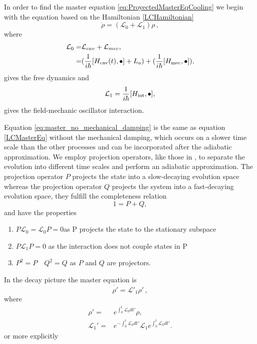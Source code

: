 \documentclass[reprint, amsmath,amssymb, aps,pra]{revtex4-1}
\begin{document}
In order to find the master equation
\eqref{eq:ProyectedMasterEqCooling} we begin with the equation based on the Hamiltonian \eqref{LCHamiltonian}
\begin{equation}\label{eq:master_no_mechanical_damping}
\dot{\rho}=(\mathcal{L}_0+\mathcal{L}_1)\rho\, ,
\end{equation}
where
\begin{align}
\mathcal{L}_0=& \mathcal{L}_{cav} + \mathcal{L}_{mec},\\
 =&(\frac{1}{i\hbar}[H_{\rm cav}(t),\bullet]+L_a) +(\frac{1}{i\hbar}[H_{\rm mec},\bullet]), \nonumber
\end{align}
gives the free dynamics 
and
\begin{equation}
\mathcal{L}_1 = \frac{1}{i\hbar}[H_{\rm int},\bullet],
\end{equation}
gives the field-mechanic oscillator interaction.

Equation \eqref{eq:master_no_mechanical_damping} is the same as
equation \eqref{LCMasterEq} without the mechanical damping, which
occurs on a slower time scale than the other processes and can be
incorporated after the adiabatic approximation. We employ projection
operators, like those in \cite{CarmichaelQO}, to separate the
evolution into different time scales and perform an adiabatic
approximation. The projection operator $P$ projects the state into a
slow-decaying evolution space whereas the projection operator $Q$
projects the system into a fast-decaying evolution space, they fulfill
the completeness relation
\begin{equation}
1 = P + Q,
\end{equation}
and have the properties
\begin{enumerate}

\item $ P\mathcal{L}_{0} = \mathcal{L}_{0}P = 0 $\qquad as P projects the state to the stationary subspace
\item $P\mathcal{L}_{1}P=0$ \qquad as the interaction does not couple states in P

\item $P^2 = P \quad Q^2 = Q$ \qquad as $P$ and $Q$ are projectors.
\end{enumerate}
In the decay picture the master equation is 
\begin{equation}
  \label{eq:master_decay_picture}
    \dot{\rho'} = \mathcal{L}'_1\rho'\, ,
\end{equation}
where
\begin{align*}
 \rho' =& e^{\int_0^t \mathcal{L}_0 dt'}\rho,\\
  \mathcal{L}_1' =& e^{-\int_0^t \mathcal{L}_0 dt'}\mathcal{L}_1e^{\int_0^t \mathcal{L}_0 dt'}.
\end{align*} or more explicitly
\end{document}

